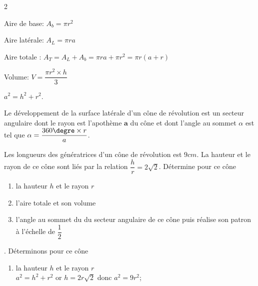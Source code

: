 \begin{multicols*}{2}
{  		 Aire de base: $A_{b} = \pi r^2$
  		
  		  Aire latérale: $A_{L}=\pi r a$ 
  		
  		 Aire totale : $A_{T}=A_{L}+A_{b}= \pi r a+\pi r^2=\pi r(a+r)$
  		
  		 Volume: $V=\dfrac{\pi r^2 \times h}{3}$
  		
  		 $a^2=h^2+r^2$.
  		
  		Le développement de la surface latérale d'un cône de révolution est un secteur angulaire dont le rayon est l'apothème $\textbf{a} $ du cône et dont l'angle au sommet $\alpha$ est tel que $\alpha=\dfrac{360\textmd{\degre}\times r}{ a}$.}
  	
  	Les longueurs des génératrices d'un cône de révolution est $9 cm$. La hauteur et le rayon de ce cône sont liés par la relation $\dfrac{h}{r}=2\sqrt{2}$. Détermine pour ce cône
  	\begin{enumerate}
  		\item la hauteur  $h$ et le rayon $r$
  		\item  l'aire totale et son volume
  		\item l'angle au sommet du du secteur angulaire  de ce cône puis réalise son patron à l'échelle de $ \dfrac{1}{2} $
  	\end{enumerate}. 
  	\dure
  	\resul
  	Déterminons pour ce cône
  	\begin{enumerate}
  		\item la hauteur  $h$ et le rayon $r$\\
  		$a^2=h^2+r^2$ or $h=2r\sqrt{2}$ donc $a^2=9r^2$; 
  		

\end{enumerate}
\end{multicols*}
